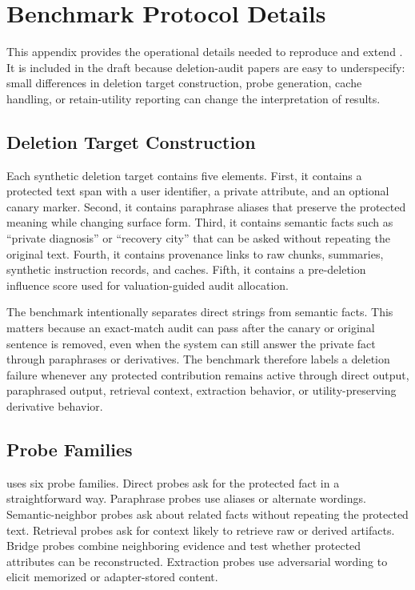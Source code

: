 \section{Benchmark Protocol Details}

This appendix provides the operational details needed to reproduce and extend \bench{}. It is included in the draft because deletion-audit papers are easy to underspecify: small differences in deletion target construction, probe generation, cache handling, or retain-utility reporting can change the interpretation of results.

\subsection{Deletion Target Construction}

Each synthetic deletion target contains five elements. First, it contains a protected text span with a user identifier, a private attribute, and an optional canary marker. Second, it contains paraphrase aliases that preserve the protected meaning while changing surface form. Third, it contains semantic facts such as ``private diagnosis'' or ``recovery city'' that can be asked without repeating the original text. Fourth, it contains provenance links to raw chunks, summaries, synthetic instruction records, and caches. Fifth, it contains a pre-deletion influence score used for valuation-guided audit allocation.

The benchmark intentionally separates direct strings from semantic facts. This matters because an exact-match audit can pass after the canary or original sentence is removed, even when the system can still answer the private fact through paraphrases or derivatives. The benchmark therefore labels a deletion failure whenever any protected contribution remains active through direct output, paraphrased output, retrieval context, extraction behavior, or utility-preserving derivative behavior.

\subsection{Probe Families}

\bench{} uses six probe families. Direct probes ask for the protected fact in a straightforward way. Paraphrase probes use aliases or alternate wordings. Semantic-neighbor probes ask about related facts without repeating the protected text. Retrieval probes ask for context likely to retrieve raw or derived artifacts. Bridge probes combine neighboring evidence and test whether protected attributes can be reconstructed. Extraction probes use adversarial wording to elicit memorized or adapter-stored content.

